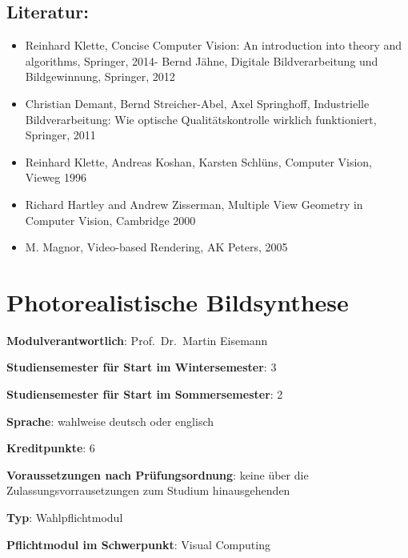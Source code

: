 \section*{Literatur:}\label{literatur-15}

\begin{itemize}
\tightlist
\item
  Reinhard Klette, Concise Computer Vision: An introduction into theory
  and algorithms, Springer, 2014- Bernd Jähne, Digitale Bildverarbeitung
  und Bildgewinnung, Springer, 2012
\item
  Christian Demant, Bernd Streicher-Abel, Axel Springhoff, Industrielle
  Bildverarbeitung: Wie optische Qualitätskontrolle wirklich
  funktioniert, Springer, 2011
\item
  Reinhard Klette, Andreas Koshan, Karsten Schlüns, Computer Vision,
  Vieweg 1996
\item
  Richard Hartley and Andrew Zisserman, Multiple View Geometry in
  Computer Vision, Cambridge 2000
\item
  M. Magnor, Video-based Rendering, AK Peters, 2005
\end{itemize}

\chapter{Photorealistische
Bildsynthese}\label{photorealistische-bildsynthese}

\begin{modulHead}
\textbf{Modulverantwortlich}: Prof.~Dr.~Martin
Eisemann
\end{modulHead}
\begin{modulHead}
\textbf{Studiensemester für
Start im Wintersemester}:
3
\end{modulHead}
\begin{modulHead}
\textbf{Studiensemester für Start
im Sommersemester}:
2
\end{modulHead}
\begin{modulHead}
\textbf{Sprache}: wahlweise deutsch
oder englisch
\end{modulHead}
\begin{modulHead}
\textbf{Kreditpunkte}:
6
\end{modulHead}
\begin{modulHead}
\textbf{Voraussetzungen nach
Prüfungsordnung}: keine über die Zulassungsvorrausetzungen zum Studium
hinausgehenden
\end{modulHead}
\begin{modulHead}
\textbf{Typ}:
Wahlpflichtmodul
\end{modulHead}
\begin{modulHead}
\textbf{Pflichtmodul
im Schwerpunkt}: Visual Computing
\end{modulHead}


